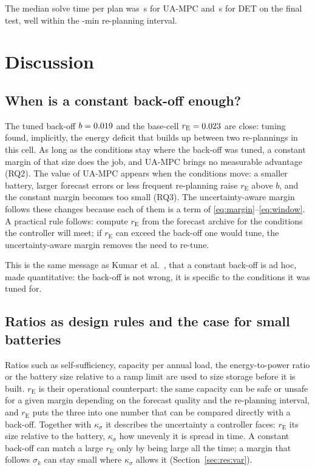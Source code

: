 \documentclass[a4paper,fleqn]{cas-dc}
\newcommand{\DET}{DET\xspace}
\newcommand{\UA}{UA-MPC\xspace}
\newcommand{\rE}{r_{\mathrm{E}}}
\begin{document}
The median solve time per plan was \finUaSolve\,s for \UA and \finDetSolve\,s for \DET on the final test, well within the \replanmin-min re-planning interval.

\section{Discussion}\label{sec:discussion}

\subsection{When is a constant back-off enough?}
The tuned back-off $b=0.019$ and the base-cell $\rE=\rEbase$ are close: tuning found, implicitly, the energy deficit that builds up between two re-plannings in this cell. As long as the conditions stay where the back-off was tuned, a constant margin of that size does the job, and \UA brings no measurable advantage (RQ2). The value of \UA appears when the conditions move: a smaller battery, larger forecast errors or less frequent re-planning raise $\rE$ above $b$, and the constant margin becomes too small (RQ3). The uncertainty-aware margin follows these changes because each of them is a term of \eqref{eq:margin}--\eqref{eq:window}. A practical rule follows: compute $\rE$ from the forecast archive for the conditions the controller will meet; if $\rE$ can exceed the back-off one would tune, the uncertainty-aware margin removes the need to re-tune.

This is the same message as Kumar et al.\ \cite{kumar2019benchmarking}, that a constant back-off is ad hoc, made quantitative: the back-off is not wrong, it is specific to the conditions it was tuned for.

\subsection{Ratios as design rules and the case for small batteries}
Ratios such as self-sufficiency, capacity per annual load, the energy-to-power ratio or the battery size relative to a ramp limit \cite{luthander2015selfconsumption,weniger2014sizing,hesse2017lithium,makibar2017relation} are used to size storage before it is built. $\rE$ is their operational counterpart: the same capacity can be safe or unsafe for a given margin depending on the forecast quality and the re-planning interval, and $\rE$ puts the three into one number that can be compared directly with a back-off. Together with $\kappa_\sigma$ it describes the uncertainty a controller faces: $\rE$ its size relative to the battery, $\kappa_\sigma$ how unevenly it is spread in time. A constant back-off can match a large $\rE$ only by being large all the time; a margin that follows $\sigma_k$ can stay small where $\kappa_\sigma$ allows it (Section~\ref{sec:res:var}).
\end{document}
